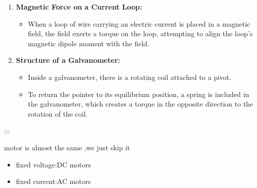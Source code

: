 \documentclass[
]{article}
\providecommand{\tightlist}{%
  \setlength{\itemsep}{0pt}\setlength{\parskip}{0pt}}
\begin{document}
\begin{enumerate}
\def\labelenumi{\arabic{enumi}.}
\tightlist
\item
  \textbf{Magnetic Force on a Current Loop:}

  \begin{itemize}
  \tightlist
  \item
    When a loop of wire carrying an electric current is placed in a
    magnetic field, the field exerts a torque on the loop, attempting to
    align the loop's magnetic dipole moment with the field.
  \end{itemize}
\item
  \textbf{Structure of a Galvanometer:}

  \begin{itemize}
  \tightlist
  \item
    Inside a galvanometer, there is a rotating coil attached to a pivot.
  \item
    To return the pointer to its equilibrium position, a spring is
    included in the galvanometer, which creates a torque in the opposite
    direction to the rotation of the coil.
  \end{itemize}
\end{enumerate}

:::

motor is almost the same ,we just skip it

\begin{itemize}
\tightlist
\item
  fixed voltage:DC motors
\item
  fixed current:AC motors
\end{itemize}
\end{document}
